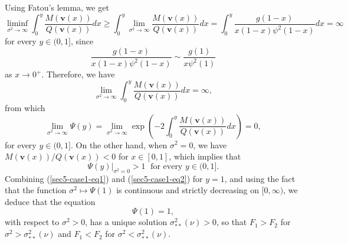 \documentclass[11pt]{article}
\begin{document}
Using Fatou's lemma, we get
\begin{equation}
\liminf_{\sigma^2\rightarrow\infty}\int_{0}^{y}\frac{M(\mathbf{v}(x))}{Q(\mathbf{v}(x))}dx\geq\int_{0}^{y}\lim_{\sigma^2\rightarrow\infty}\frac{M(\mathbf{v}(x))}{Q(\mathbf{v}(x))}dx=\int_{0}^{y}\frac{g(1-x)}{x(1-x)\psi^2(1-x)}dx=\infty
\end{equation}
for every $y\in(0,1]$,
since 
\begin{equation}
\frac{g(1-x)}{x(1-x)\psi^2(1-x)}\sim \frac{g(1)}{x\psi^2(1)}
\end{equation} 
as $x\rightarrow0^{+}$.
Therefore, we have
\begin{equation}
\lim_{\sigma^2\rightarrow\infty}\int_{0}^{y}\frac{M(\mathbf{v}(x))}{Q(\mathbf{v}(x))}dx=\infty,
\end{equation}
from which 
\begin{equation}\label{sec5-case1-eq1}
\lim_{\sigma^2\rightarrow\infty}\Psi(y)=\lim_{\sigma^2\rightarrow\infty}\exp\left(-2\int_{0}^{y}\frac{M(\mathbf{v}(x))}{Q(\mathbf{v}(x))}dx\right)=0,
\end{equation}
for every $y\in(0,1]$.
On the other hand, when $\sigma^2=0$, we have $M(\mathbf{v}(x))/Q(\mathbf{v}(x))<0$ for $x\in[0,1]$, which implies that 
\begin{equation}\label{sec5-case1-eq2}
\Psi(y)|_{\sigma^2=0}>1\;\mbox{ for every   } y\in(0,1].
\end{equation} 
Combining  (\ref{sec5-case1-eq1}) and (\ref{sec5-case1-eq2}) for $y=1$, and using the fact that the function $\sigma^2\longmapsto\Psi(1)$ is continuous and strictly decreasing on $[0,\infty)$, we deduce that  the equation
\begin{equation}
\Psi(1)=1,
\end{equation}
with respect to $\sigma^2>0$, has a unique solution $\sigma^2_{**}(\nu)>0$,
so that $F_1>F_2$ for $\sigma^2>\sigma^2_{**}(\nu)$ and $F_1<F_2$ for $\sigma^2<\sigma^2_{**}(\nu)$.
\end{document}
